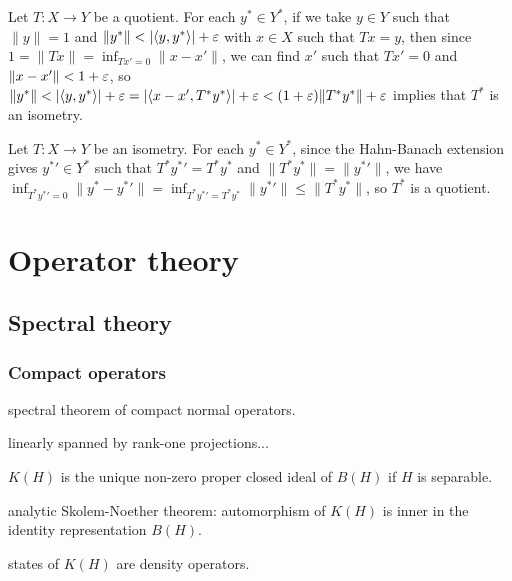 \documentclass{../../large}
\begin{document}
\begin{prb}
\end{prb}


\begin{prb}
\end{prb}



Let $T:X\to Y$ be a quotient.
For each $y^*\in Y^*$, if we take $y\in Y$ such that $\|y\|=1$ and $\|y^*\|<|\<y,y^*\>|+\e$ with $x\in X$ such that $Tx=y$, then since $1=\|Tx\|=\inf_{Tx'=0}\|x-x'\|$, we can find $x'$ such that $Tx'=0$ and $\|x-x'\|<1+\varepsilon$, so $\|y^*\|<|\<y,y^*\>|+\e=|\<x-x',T^*y^*\>|+\e<(1+\e)\|T^*y^*\|+\e$ implies that $T^*$ is an isometry.

Let $T:X\to Y$ be an isometry.
For each $y^*\in Y^*$, since the Hahn-Banach extension gives ${y^*}'\in Y^*$ such that $T^*{y^*}'=T^*y^*$ and $\|T^*y^*\|=\|{y^*}'\|$, we have $\inf_{T^*{y^*}'=0}\|y^*-{y^*}'\|=\inf_{T^*{y^*}'=T^*y^*}\|{y^*}'\|\le\|T^*y^*\|$, so $T^*$ is a quotient.



\part{Operator theory}

\chapter{Spectral theory}



\section{Compact operators}

spectral theorem of compact normal operators.


linearly spanned by rank-one projections...

$K(H)$ is the unique non-zero proper closed ideal of $B(H)$ if $H$ is separable.


analytic Skolem-Noether theorem: automorphism of $K(H)$ is inner in the identity representation $B(H)$.

states of $K(H)$ are density operators.
\end{document}
